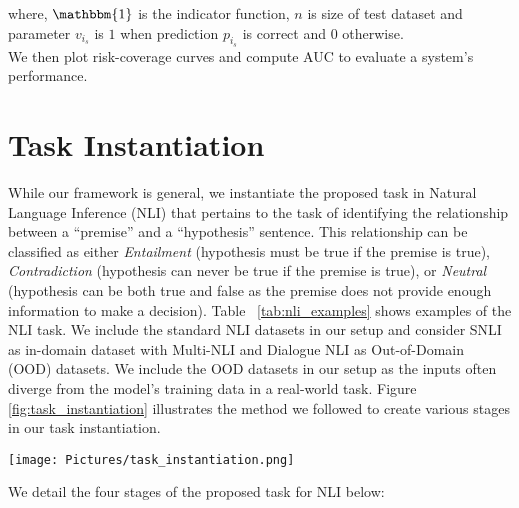 \documentclass[11pt,a4paper]{article}
\begin{document}
where, $\mathbbm{1}$ is the indicator function, $n$ is size of test dataset and parameter $v_{i_s}$ is $1$ when prediction $p_{i_s}$ is correct and 0 otherwise.  \\
We then plot risk-coverage curves and compute AUC to evaluate a system's performance.

\section{Task Instantiation}
\label{instantiation}
While our framework is general, we instantiate the proposed task in Natural Language Inference (NLI) that pertains to the task of identifying the relationship between a ``premise'' and a ``hypothesis'' sentence.
This relationship can be classified as either \textit{Entailment} (hypothesis must be true if the premise is true), \textit{Contradiction} (hypothesis can never be true if the premise is true), or \textit{Neutral} (hypothesis can be both true and false as the premise does not provide enough information to make a decision).
Table ~\ref{tab:nli_examples} shows examples of the NLI task.
We include the standard NLI datasets in our setup and consider SNLI \cite{bowman-etal-2015-large} as in-domain dataset with Multi-NLI \cite{williams-etal-2018-broad} and Dialogue NLI \cite{welleck-etal-2019-dialogue} as Out-of-Domain (OOD) datasets. 
We include the OOD datasets in our setup as the inputs often diverge from the model's training data in a real-world task.
Figure \ref{fig:task_instantiation} illustrates the method we followed to create various stages in our task instantiation.
\begin{figure*}[t]
    \centering
    \texttt{[image: Pictures/task\_instantiation.png]}
    \caption{Steps involved at every stage during instantiation of the proposed task for NLI.}
    \label{fig:task_instantiation}
\end{figure*}
We detail the four stages of the proposed task for NLI below:
\end{document}
